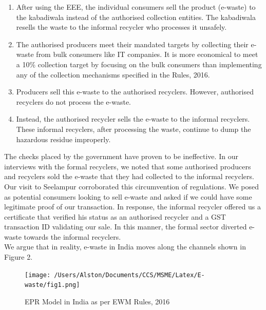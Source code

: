 \documentclass[a4paper, 12pt]{article}
\begin{document}
                    \begin{enumerate}
                      \item After using the EEE, the individual consumers sell the product (e-waste) to the kabadiwala instead of the authorised collection entities. The kabadiwala resells the waste to the informal recycler who processes it unsafely. 
                      \item The authorised producers meet their mandated targets by collecting their e-waste from bulk consumers like IT companies. It is more economical to meet a 10\% collection target by focusing on the bulk consumers than implementing any of the collection mechanisms specified in the Rules, 2016.
                      \item Producers sell this e-waste to the authorised recyclers. However, authorised recyclers do not process the e-waste.  
                      \item Instead, the authorised recycler sells the e-waste to the informal recyclers. These informal recyclers, after processing the waste, continue to dump the hazardous residue improperly.
                    \end{enumerate}
                    
                    The checks placed by the government have proven to be ineffective. In our interviews with the formal recyclers, we noted that some authorised producers and recyclers sold the e-waste that they had collected to the informal recyclers. \\
                    
                    Our visit to Seelampur corroborated this circumvention of regulations. We posed as potential consumers looking to sell e-waste and asked if we could have some legitimate proof of our transaction. In response, the informal recycler offered us a certificate that verified his status as an authorised recycler and a GST transaction ID validating our sale. In this manner, the formal sector diverted e-waste towards the informal recyclers. \\
                    
                    We argue that in reality, e-waste in India moves along the channels shown in Figure 2. \\
                    
                    \begin{figure}[H]
                    	\centering
                    	\texttt{[image: /Users/Alston/Documents/CCS/MSME/Latex/E-waste/fig1.png]}
                    	\caption[Optional Caption]{EPR Model in India as per EWM Rules, 2016}
                    \end{figure}
                    
\end{document}
